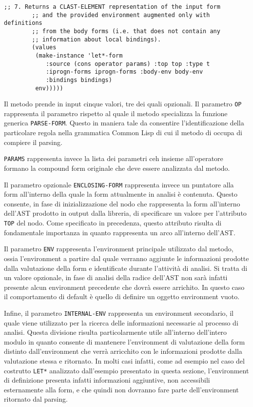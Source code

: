 \begin{lstlisting}[caption=Semplificazione del metodo \texttt{PARSE-FORM} per
il parsing del costrutto \texttt{LET*}]
        ;; 7. Returns a CLAST-ELEMENT representation of the input form
        ;; and the provided environment augmented only with definitions
        ;; from the body forms (i.e. that does not contain any
        ;; information about local bindings).
        (values
         (make-instance 'let*-form
            :source (cons operator params) :top top :type t
            :iprogn-forms iprogn-forms :body-env body-env
            :bindings bindings)
         env)))))

\end{lstlisting}

Il metodo prende in input cinque valori, tre dei quali opzionali. Il parametro
\texttt{OP} rappresenta il parametro rispetto al quale il metodo specializza
la funzione generica \texttt{PARSE-FORM}. Questo in maniera tale da consentire
l'identificazione della particolare regola nella grammatica Common Lisp di cui
il metodo di occupa di compiere il parsing.

\texttt{PARAMS} rappresenta invece la lista dei parametri ceh insieme
all'operatore formano la compound form originale che deve essere analizzata
dal metodo.

Il parametro opzionale \texttt{ENCLOSING-FORM} rappresenta invece un puntatore
alla form all'interno della quale la form attualmente in analisi è contenuta.
Questo consente, in fase di inizializzazione del nodo che rappresenta la form
all'interno dell'AST prodotto in output dalla libreria, di specificare un
valore per l'attributo \texttt{TOP} del nodo. Come specificato in precedenza,
questo attributo risulta di fondamentale importanza in quanto rappresenta un
arco all'interno dell'AST.

Il parametro \texttt{ENV} rappresenta l'environment principale utilizzato dal
metodo, ossia l'environment a partire dal quale verranno aggiunte le
informazioni prodotte dalla valutazione della form e identificate durante
l'attività di analisi. Si tratta di un valore opzionale, in fase di analisi
della radice dell'AST non sarà infatti presente alcun environment precedente
che dovrà essere arrichito. In questo caso il comportamento di default è
quello di definire un oggetto environment vuoto.

Infine, il parametro \texttt{INTERNAL-ENV} rappresenta un environment
secondario, il quale viene utilizzato per la ricerca delle informazioni
necessarie al processo di analisi. Questa divisione risulta particolarmente
utile all'interno dell'intero modulo in quanto consente di mantenere
l'environment di valutazione della form distinto dall'environment che verrà
arricchito con le informazioni prodotte dalla valutazione stessa e ritornato.
In molti casi infatti, come ad esempio nel caso del costrutto \texttt{LET*}
analizzato dall'esempio presentato in questa sezione, l'environment di
definizione presenta infatti informazioni aggiuntive, non accessibili
esternamente alla form, e che quindi non dovranno fare parte dell'environment
ritornato dal parsing.

